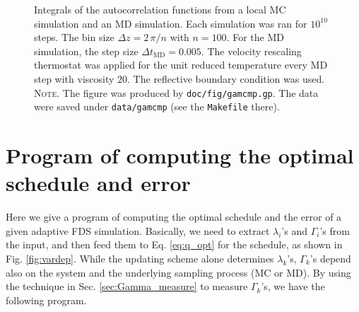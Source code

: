 \documentclass[reprint, floatfix]{revtex4-1}
\newcommand{\note}[1]{{\color{DarkGreen}\footnotesize \textsc{Note.} #1}}
\begin{document}
\begin{figure}[h]
\begin{center}
  \caption{
    \label{fig:gamcmp}
    Integrals of the autocorrelation functions
    from a local MC simulation
    and an MD simulation.
    Each simulation was ran for $10^{10}$ steps.
    The bin size $\Delta z = 2\, \pi /n$ with $n = 100$.
    For the MD simulation,
    the step size $\Delta t_\mathrm{MD} = 0.005$.
    The velocity rescaling thermostat\cite{bussi2007} was
    applied for the unit reduced temperature
    every MD step with viscosity $20$.
    The reflective boundary condition was used.
    \note{The figure was produced by \texttt{doc/fig/gamcmp.gp}.
      The data were saved under \texttt{data/gamcmp}
      (see the \texttt{Makefile} there).
    }%
  }
\end{center}
\end{figure}






\section{\label{sec:program}
Program of computing the optimal schedule and error
}


Here we give a program of computing
the optimal schedule and the error
of a given adaptive FDS simulation.
%
Basically, we need to extract
$\lambda_i$'s and $\Gamma_i$'s
from the input,
and then feed them to Eq. \eqref{eq:q_opt}
for the schedule,
as shown in Fig. \ref{fig:vardep}.
%
%
While the updating scheme alone
determines $\lambda_k$'s,
$\Gamma_k$'s depend also on the system
and the underlying sampling process (MC or MD).
%
By using the technique in Sec. \ref{sec:Gamma_measure}
to measure $\Gamma_k$'s,
we have the following program.
\end{document}
